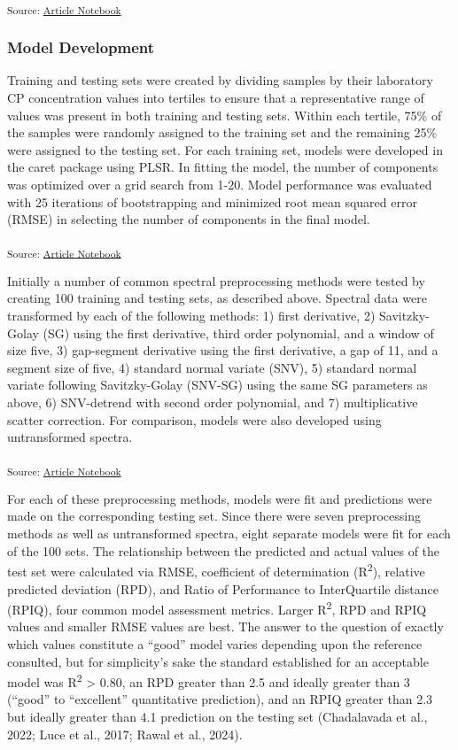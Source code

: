 \documentclass[
]{agujournal2019}
\begin{document}
\textsubscript{Source:
\href{https://rvcrawford.github.io/glowing-system/index.qmd.html}{Article
Notebook}}

\subsubsection{Model Development}\label{model-development}

Training and testing sets were created by dividing samples by their
laboratory CP concentration values into tertiles to ensure that a
representative range of values was present in both training and testing
sets. Within each tertile, 75\% of the samples were randomly assigned to
the training set and the remaining 25\% were assigned to the testing
set. For each training set, models were developed in the caret package
using PLSR. In fitting the model, the number of components was optimized
over a grid search from 1-20. Model performance was evaluated with 25
iterations of bootstrapping and minimized root mean squared error (RMSE)
in selecting the number of components in the final model.

\textsubscript{Source:
\href{https://rvcrawford.github.io/glowing-system/index.qmd.html}{Article
Notebook}}

Initially a number of common spectral preprocessing methods were tested
by creating 100 training and testing sets, as described above. Spectral
data were transformed by each of the following methods: 1) first
derivative, 2) Savitzky-Golay (SG) using the first derivative, third
order polynomial, and a window of size five, 3) gap-segment derivative
using the first derivative, a gap of 11, and a segment size of five, 4)
standard normal variate (SNV), 5) standard normal variate following
Savitzky-Golay (SNV-SG) using the same SG parameters as above, 6)
SNV-detrend with second order polynomial, and 7) multiplicative scatter
correction. For comparison, models were also developed using
untransformed spectra.

\textsubscript{Source:
\href{https://rvcrawford.github.io/glowing-system/index.qmd.html}{Article
Notebook}}

For each of these preprocessing methods, models were fit and predictions
were made on the corresponding testing set. Since there were seven
preprocessing methods as well as untransformed spectra, eight separate
models were fit for each of the 100 sets. The relationship between the
predicted and actual values of the test set were calculated via RMSE,
coefficient of determination (R\textsuperscript{2}), relative predicted
deviation (RPD), and Ratio of Performance to InterQuartile distance
(RPIQ), four common model assessment metrics. Larger
R\textsuperscript{2}, RPD and RPIQ values and smaller RMSE values are
best. The answer to the question of exactly which values constitute a
``good'' model varies depending upon the reference consulted, but for
simplicity's sake the standard established for an acceptable model was
R\textsuperscript{2} \textgreater{} 0.80, an RPD greater than 2.5 and
ideally greater than 3 (``good'' to ``excellent'' quantitative
prediction), and an RPIQ greater than 2.3 but ideally greater than 4.1
prediction on the testing set (Chadalavada et al., 2022; Luce et al.,
2017; Rawal et al., 2024).
\end{document}
